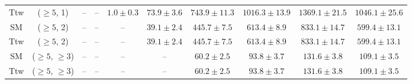 \begin{table}[h!]
{\begin{tabular}{cccccccccc}
	Ttw & ($\ge5$, 1) & -- & -- & $1.0\pm 0.3$ & $73.9\pm 3.6$ & $743.9\pm 11.3$ & $1016.3\pm 13.9$ & $1369.1\pm 21.5$ & $1046.1\pm 25.6$ \\[0.5ex] 
	SM & ($\ge5$, 2) & -- & -- & -- & $39.1\pm 2.4$ & $445.7\pm 7.5$ & $613.4\pm 8.9$ & $833.1\pm 14.7$ & $599.4\pm 13.1$ \\[0.5ex] 
	Ttw & ($\ge5$, 2) & -- & -- & -- & $39.1\pm 2.4$ & $445.7\pm 7.5$ & $613.4\pm 8.9$ & $833.1\pm 14.7$ & $599.4\pm 13.1$ \\[0.5ex] 
	SM & ($\ge5$, $\ge3$) & -- & -- & -- & -- & $60.2\pm 2.5$ & $93.8\pm 3.7$ & $131.6\pm 3.8$ & $109.1\pm 3.5$ \\[0.5ex] 
	Ttw & ($\ge5$, $\ge3$) & -- & -- & -- & -- & $60.2\pm 2.5$ & $93.8\pm 3.7$ & $131.6\pm 3.8$ & $109.1\pm 3.5$ \\[0.5ex] 
	\hline
	\hline
\end{tabular}}
\end{table}

